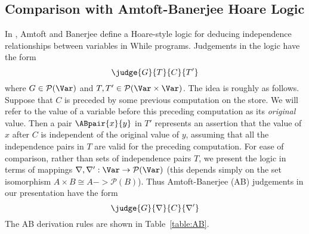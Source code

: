 \documentclass{sigplanconf}
\newcommand{\pset}{\mathcal{P}}
\begin{document}
\subsection{Comparison with Amtoft-Banerjee Hoare Logic}
In \cite{Amtoft:Banerjee:SAS04}, Amtoft and Banerjee define a Hoare-style logic for deducing independence relationships
between variables in While programs.
Judgements in the logic have the form
\[
    \judge{G}{T}{C}{T'}
\]
where $G \in \pset(\Var)$ and $T, T' \in \pset(\Var \times \Var)$.
The idea is roughly as follows.
Suppose that $C$ is preceded by some previous computation on the store.
We will refer to the
value of a variable before this preceding computation as its \emph{original} value.
Then a pair
$\ABpair{x}{y}$ in $T'$ represents an assertion that the value of $x$ after $C$ is independent
of the original value of $y$, assuming that all the independence pairs in $T$ are valid
for the preceding computation.
For ease of comparison, rather than sets of independence pairs $T$,
we present the logic in terms of mappings $\nabla, \nabla' : \Var -> \pset(\Var)$
(this depends simply on the set isomorphism $A \times B \cong A -> \pset(B)$).
Thus Amtoft-Banerjee (AB) judgements in our presentation have the form
\[
    \judge{G}{\nabla}{C}{\nabla'}
\]
The AB derivation rules are shown in Table~\ref{table:AB}.
\end{document}
